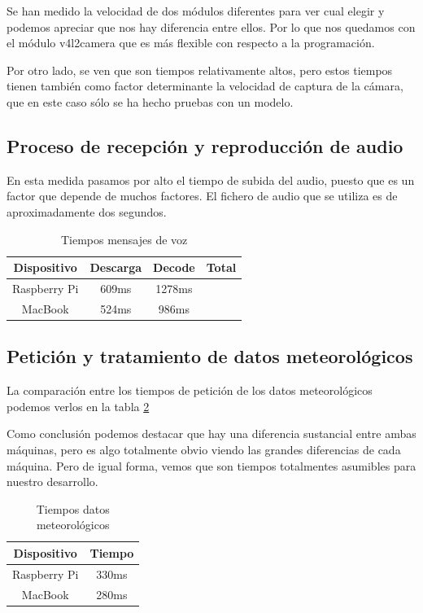 \documentclass[10pt,journal,compsoc]{IEEEtran}
\begin{document}
Se han medido la velocidad de dos módulos diferentes para ver cual elegir y 
podemos apreciar que nos hay diferencia entre ellos. Por lo que nos quedamos con 
el módulo v4l2camera que es más flexible con respecto a la programación.

Por otro lado, se ven que son tiempos relativamente altos, pero estos tiempos 
tienen también como factor determinante la velocidad de captura de la cámara, 
que en este caso sólo se ha hecho pruebas con un modelo.

\subsection{Proceso de recepción y reproducción de audio}

En esta medida pasamos por alto el tiempo de subida del audio, puesto que es un 
factor que depende de muchos factores. El fichero de audio que se utiliza es de 
aproximadamente dos segundos.

\begin{table}[h]
\centering
\begin{tabular}{cccc}
Dispositivo & Descarga & Decode & Total \\ \hline
Raspberry Pi & 609ms &  1278ms\\
MacBook &  524ms & 986ms
\end{tabular} 
\caption{Tiempos mensajes de voz}
\label{tab:tiemposVoz}
\end{table}

\subsection{Petición y tratamiento de datos meteorológicos}

La comparación entre los tiempos de petición de los datos meteorológicos podemos 
verlos en la tabla \ref{tab:tiemposMet}

Como conclusión podemos destacar que hay una diferencia sustancial entre ambas 
máquinas, pero es algo totalmente obvio viendo las grandes diferencias de cada 
máquina. Pero de igual forma, vemos que son tiempos totalmentes asumibles para 
nuestro desarrollo.

\begin{table}[h]
\centering
\begin{tabular}{cc}
Dispositivo & Tiempo\\ \hline
Raspberry Pi & 330ms\\
MacBook &  280ms
\end{tabular} 
\caption{Tiempos datos meteorológicos}
\label{tab:tiemposMet}
\end{table}
\end{document}
